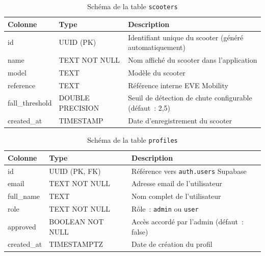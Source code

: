 \documentclass[12pt, a4paper]{report}
\begin{document}
\begin{table}[H]
  \centering
  \caption{Schéma de la table \texttt{scooters}}
  \label{tab:table_scooters}
  \renewcommand{\arraystretch}{1.4}
  \small
  \begin{tabularx}{\textwidth}{|p{3cm}|p{2.5cm}|X|}
    \hline
    \rowcolor{isimablue!20}
    \textbf{Colonne} & \textbf{Type} & \textbf{Description} \\
    \hline
    id             & UUID (PK)          & Identifiant unique du scooter (généré automatiquement) \\
    \hline
    name           & TEXT NOT NULL      & Nom affiché du scooter dans l'application \\
    \hline
    model          & TEXT               & Modèle du scooter \\
    \hline
    reference      & TEXT               & Référence interne EVE Mobility \\
    \hline
    fall\_threshold & DOUBLE PRECISION   & Seuil de détection de chute configurable (défaut~: 2,5) \\
    \hline
    created\_at    & TIMESTAMP          & Date d'enregistrement du scooter \\
    \hline
  \end{tabularx}
\end{table}

\begin{table}[H]
  \centering
  \caption{Schéma de la table \texttt{profiles}}
  \label{tab:table_profiles}
  \renewcommand{\arraystretch}{1.4}
  \small
  \begin{tabularx}{\textwidth}{|p{3cm}|p{2.5cm}|X|}
    \hline
    \rowcolor{isimablue!20}
    \textbf{Colonne} & \textbf{Type} & \textbf{Description} \\
    \hline
    id       & UUID (PK, FK)       & Référence vers \texttt{auth.users} Supabase \\
    \hline
    email    & TEXT NOT NULL       & Adresse email de l'utilisateur \\
    \hline
    full\_name & TEXT              & Nom complet de l'utilisateur \\
    \hline
    role     & TEXT NOT NULL       & Rôle~: \texttt{admin} ou \texttt{user} \\
    \hline
    approved & BOOLEAN NOT NULL    & Accès accordé par l'admin (défaut~: false) \\
    \hline
    created\_at & TIMESTAMPTZ      & Date de création du profil \\
    \hline
  \end{tabularx}
\end{table}
\end{document}
